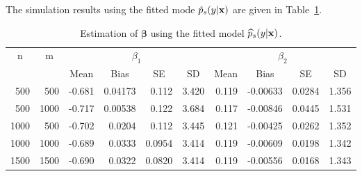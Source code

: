\documentclass[12pt]{article}
\def\x{{\bf x}}
\def\bb{{\boldsymbol\beta}}
\begin{document}
The simulation results using the fitted mode $\hat{p}_s(y|\x)$ are given in Table~\ref{Table:Set1-Fitted}.
\begin{table}[ht]
	\centering
	\begin{tabular}{rrrrrrrrrr}
		\hline\hline
		\multicolumn{1}{c|}{\multirow{2}{*}{n}} & \multicolumn{1}{c|}{\multirow{2}{*}{m}} & \multicolumn{4}{c|}{$\beta_1$}                                                                      & \multicolumn{4}{c}{$\beta_2$}                                                                      \\ \cline{3-10} 
		\multicolumn{1}{c|}{}                  & \multicolumn{1}{c|}{}                  & \multicolumn{1}{c}{Mean} & \multicolumn{1}{c}{Bias} & \multicolumn{1}{c}{SE} & \multicolumn{1}{c|}{SD} & \multicolumn{1}{c}{Mean} & \multicolumn{1}{c}{Bias} & \multicolumn{1}{c}{SE} & \multicolumn{1}{c}{SD} \\ \hline\hline
		500 &    500                                    &         -0.681             &           0.04173           &          0.112            &            3.420          &         0.119             &            -0.00633          &           0.0284           &         1.356             \\
		500 &               1000                         &       -0.717               &             0.00538        &      0.122              &           3.684         &         0.117            &       -0.00846            &          0.0445          &       1.531             \\
		1000 & 500                                      &        -0.702              &            0.0204          &          0.112           &            3.445          &         0.121             &        -0.00425              &            0.0262          &          1.352                    \\
		1000&                1000                        &         -0.689             &         0.0333             &         0.0954             &       3.414                &        0.119              &        -0.00609              &         0.0198             &          1.342            \\
		1500 &             1500                           &       -0.690              &      0.0322                &   0.0820                  &         3.414             &      0.119                &       -0.00556               &        0.0168             &         1.343             \\ \hline\hline
	\end{tabular}
	\caption{Estimation of $\bb$ using the fitted model $\widehat p_s(y|\x)$.}
	\label{Table:Set1-Fitted}
\end{table}
\end{document}
